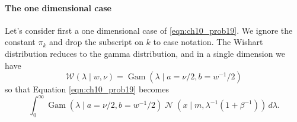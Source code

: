 \documentclass[12pt, a4paper]{article}
\DeclareMathOperator{\N}{\mathcal{N}}
\begin{document}
\paragraph{The one dimensional case}
Let's consider first a one dimensional case of \eqref{eqn:ch10_prob19}.
We ignore the constant $\pi_k$ and drop the subscript on $k$ to ease notation.
The Wishart distribution reduces to the gamma distribution, and in a single dimension we have
\begin{equation*}
	\mathcal{W}
	\left( \lambda \mid w, \nu \right)
	=
	\operatorname{Gam}(\lambda \mid a = \nu / 2, b = w^{-1}/2)
\end{equation*}
so that Equation \eqref{eqn:ch10_prob19} becomes
\begin{equation*}
\int_0^{\infty}
\operatorname{Gam}(\lambda \mid a = \nu / 2, b = w^{-1}/2)
\N \left( x \mid m , 
\lambda^{-1} (1 + \beta^{-1}) \right)
\, d \lambda.
\end{equation*}
\end{document}
